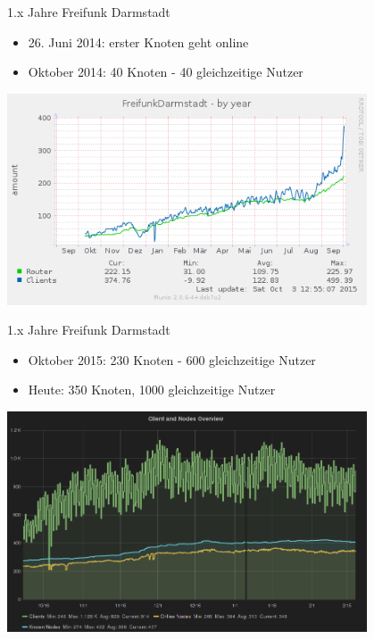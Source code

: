 \documentclass[10pt]{beamer}
\begin{document}
    \begin{frame}{1.x Jahre Freifunk Darmstadt}
      \vfill
      \begin{itemize}
        \item 26. Juni 2014: erster Knoten geht online
        \item Oktober 2014: 40 Knoten - 40 gleichzeitige Nutzer

      \end{itemize}
      \begin{center}
        \includegraphics[width=0.8\textwidth]{images/ffda-Okt14-15}
      \end{center}
    \end{frame}

    \begin{frame}{1.x Jahre Freifunk Darmstadt}
      \vfill
      \begin{itemize}
        \item Oktober 2015: 230 Knoten - 600 gleichzeitige Nutzer
        \item Heute: 350 Knoten, 1000 gleichzeitige Nutzer
      \end{itemize}
      \begin{center}
        \includegraphics[width=0.8\textwidth]{images/ffda-Okt15-Feb16}
      \end{center}
    \end{frame}
\end{document}
